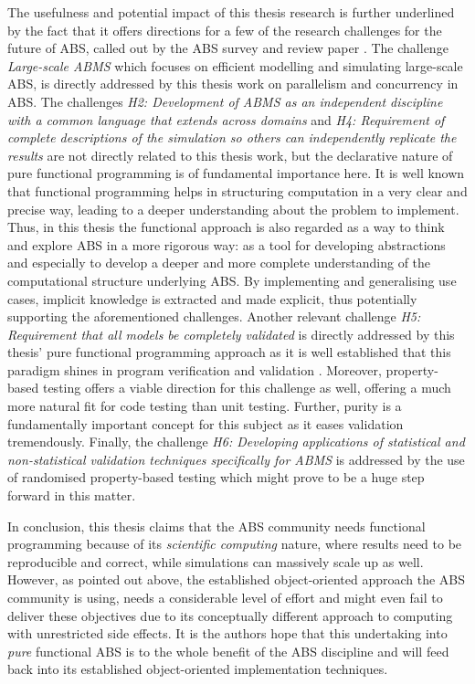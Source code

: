 The usefulness and potential impact of this thesis research is further underlined by the fact that it offers directions for a few of the research challenges for the future of ABS, called out by the ABS survey and review paper \cite{macal_everything_2016}. The challenge \textit{Large-scale ABMS} which focuses on efficient modelling and simulating large-scale ABS, is directly addressed by this thesis work on parallelism and concurrency in ABS. The challenges \emph{H2: Development of ABMS as an independent discipline with a common language that extends across domains} and \emph{H4: Requirement of complete descriptions of the simulation so others can independently replicate the results} are not directly related to this thesis work, but the declarative nature of pure functional programming is of fundamental importance here. It is well known that functional programming helps in structuring computation in a very clear and precise way, leading to a deeper understanding about the problem to implement. Thus, in this thesis the functional approach is also regarded as a way to think and explore ABS in a more rigorous way: as a tool for developing abstractions and especially to develop a deeper and more complete understanding of the computational structure underlying ABS. By implementing and generalising use cases, implicit knowledge is extracted and made explicit, thus potentially supporting the aforementioned challenges. Another relevant challenge \emph{H5: Requirement that all models be completely validated} is directly addressed by this thesis' pure functional programming approach as it is well established that this paradigm shines in program verification and validation \cite{hudak_history_2007, hutton_tutorial_1999}. Moreover, property-based testing offers a viable direction for this challenge as well, offering a much more natural fit for code testing than unit testing. Further, purity is a fundamentally important concept for this subject as it eases validation tremendously. Finally, the challenge \emph{H6: Developing applications of statistical and non-statistical validation techniques specifically for ABMS} is addressed by the use of randomised property-based testing which might prove to be a huge step forward in this matter.

\medskip

In conclusion, this thesis claims that the ABS community needs functional programming because of its \textit{scientific computing} nature, where results need to be reproducible and correct, while simulations can massively scale up as well. However, as pointed out above, the established object-oriented approach the ABS community is using, needs a considerable level of effort and might even fail to deliver these objectives due to its conceptually different approach to computing with unrestricted side effects. It is the authors hope that this undertaking into \textit{pure} functional ABS is to the whole benefit of the ABS discipline and will feed back into its established object-oriented implementation techniques.


